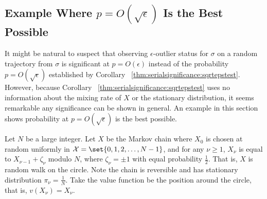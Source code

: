 \documentclass[12pt]{article}
\begin{document}
\begin{example}
\begin{example}
\end{example}

\subsection*{Example Where \( p = O(\sqrt{\epsilon}) \) Is the Best
Possible}

It might be natural to suspect that observing \( \epsilon \)-outlier
status for \( \sigma \) on a random trajectory from \( \sigma \) is
significant at \( p = O(\epsilon) \) instead of the probability \( p = O
(\sqrt{\epsilon}) \) established by Corollary~%
\ref{thm:serialsignificance:sqrtepstest}.  However, because Corollary~%
\ref{thm:serialsignificance:sqrtepstest} uses no information about the
mixing rate of \( X \) or the stationary distribution, it seems
remarkable any significance can be shown in general.  An example in this
section shows probability at \( p = O( \sqrt{\epsilon}) \) is the best
possible.

Let \( N \) be a large integer.  Let \( X \) be the Markov chain where \(
X_0 \) is chosen at random uniformly in \( \mathcal{X} = \set{0, 1, 2,
\dots , N-1} \), and for any \( \nu \ge 1 \), \( X_{\nu} \) is equal to \(
X_{\nu-1} + \zeta_{\nu} \) modulo \( N \), where \( \zeta_{\nu} = \pm 1 \)
with equal probability \( \frac{1}{2} \).  That is, \( X \) is random
walk on the circle.  Note the chain is reversible and has stationary
distribution \( \pi_\nu = \frac{1}{N} \). %
Take the value function be the position around the circle, that is, \( v
(X_{\nu}) = X_{\nu} \). %


\end{example}
\end{document}
